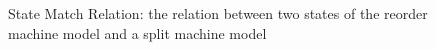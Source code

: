 \begin{figure}
%
\caption{State Match Relation: the relation between two states of the reorder  machine model and a split machine model}
\label{fig:chapter:conlink:reorder-refines-split}
\end{figure}

